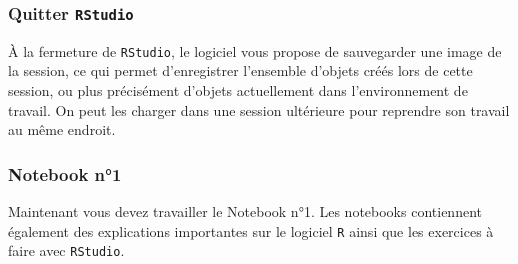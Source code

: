 \documentclass[11pt]{article}
\numberwithin{equation}{section}
\theoremstyle{remark}
\begin{document}
\subsubsection{Quitter \texttt{RStudio}}
\`A la fermeture de  \texttt{RStudio}, le logiciel vous propose de sauvegarder une image de la session, ce qui permet d'enregistrer l'ensemble d'objets créés lors de cette session, ou plus précisément d'objets actuellement dans l'environnement de travail. On peut les charger dans une session ultérieure pour reprendre son travail au même endroit.


 \subsubsection*{Notebook n°1}
Maintenant vous devez travailler le Notebook n°1. Les notebooks contiennent également des explications importantes sur le logiciel \texttt{R}  ainsi que les exercices à faire avec \texttt{RStudio}.
\end{document}
